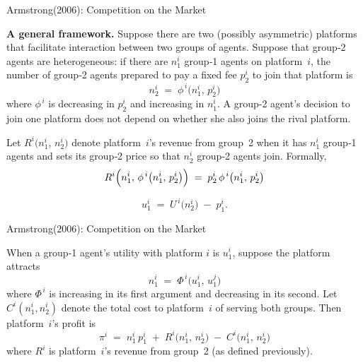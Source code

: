\documentclass[aspectratio=169]{beamer}  %
\begin{document}
\begin{frame}{Armstrong(2006): Competition on the Market}
    \justifying  %

    \textbf{A general framework.} Suppose there are two (possibly asymmetric) platforms 
    that facilitate interaction between two groups of agents.  Suppose that group‐2 
    agents are heterogeneous: if there are \(n_{1}^{i}\) group‐1 agents on platform~\(i\), 
    the number of group‐2 agents prepared to pay a fixed fee \(p_{2}^{i}\) to join that 
    platform is
    \[
       n_{2}^{i} 
       \;=\; 
       \phi^{\,i}\bigl(n_{1}^{i},\,p_{2}^{i}\bigr)
    \]
    where \(\phi^{\,i}\) is decreasing in \(p_{2}^{i}\) and increasing in \(n_{1}^{i}\). 
    A group‐2 agent’s decision to join one platform does not depend on whether she also 
    joins the rival platform.
    
    \medskip
    
    Let \(R^{i}\bigl(n_{1}^{i},\,n_{2}^{i}\bigr)\) denote platform~\(i\)’s revenue from 
    group~2 when it has \(n_{1}^{i}\) group‐1 agents and sets its group‐2 price so that 
    \(n_{2}^{i}\) group‐2 agents join. Formally,
    \[
       R^{i}\Bigl(n_{1}^{i},\,\phi^{\,i}\bigl(n_{1}^{i},\,p_{2}^{i}\bigr)\Bigr)
       \;=\;
       p_{2}^{i}\,\phi^{\,i}\bigl(n_{1}^{i},\,p_{2}^{i}\bigr)
    \]
    
    \[
       u_{1}^{i}
       \;=\;
       U^{\,i}\bigl(n_{2}^{i}\bigr)
       \;-\;
       p_{1}^{i}.
    \]
\end{frame}

\begin{frame}{Armstrong(2006): Competition on the Market}
    \justifying  %

    When a group‐1 agent’s utility with platform \(i\) is \(u_{1}^{i}\), suppose the platform 
    attracts 
    \[
       n_{1}^{i} 
       \;=\; 
       \Phi^{\,i}\bigl(u_{1}^{i},\,u_{1}^{j}\bigr)
    \]
    where \(\Phi^{\,i}\) is increasing in its first argument and decreasing in its second.  
    Let \(C^{i}(n_{1}^{i},n_{2}^{i})\) denote the total cost to platform~\(i\) of serving both groups.  
    Then platform~\(i\)’s profit is
    \[
       \pi^{i}
       \;=\;
       n_{1}^{i}\,p_{1}^{i}
       \;+\;
       R^{i}\!\bigl(n_{1}^{i},\,n_{2}^{i}\bigr)
       \;-\;
       C^{i}\!\bigl(n_{1}^{i},\,n_{2}^{i}\bigr)
    \]
    where \(R^{i}\) is platform~\(i\)’s revenue from group~2 (as defined previously).
 
    
\end{frame}
\end{document}
